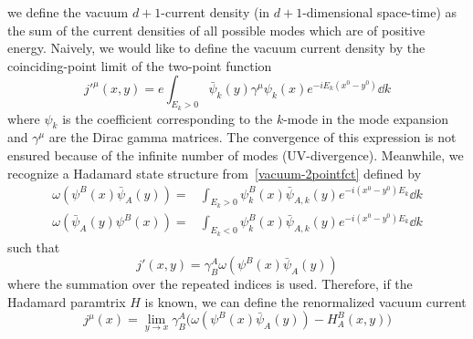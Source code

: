 we define the vacuum $d+1$-current density (in $d+1$-dimensional space-time) as the sum of the current densities of all possible modes which are of positive energy. 
Naively, we would like to define the vacuum current density by the coinciding-point limit of the two-point function
\begin{equation}\label{vacuum-2pointfct}
j'^{\mu}(x,y) =  e \int_{E_k > 0} \bar{\psi}_k(y)\gamma^\mu \psi_k(x) e^{- i E_k(x^0 - y^0)} \dd k
\end{equation}
where $\psi_k$ is the coefficient corresponding to the $k$-mode in the mode expansion and $\gamma^\mu$ are the Dirac gamma matrices.
The convergence of this expression is not ensured because of the infinite number of modes (UV-divergence).
Meanwhile, we recognize a Hadamard state structure from~\cref{vacuum-2pointfct} defined by 
\begin{equation}\label{vacuum-hadamardstate}
\begin{split}
\omega(\psi^B(x)\bar{\psi}_A(y)) = & \int_{E_k >0} \psi_k^B(x)\bar{\psi}_{A,k}(y)e^{-i(x^0-y^0)E_k} \dd k \\
\omega(\bar{\psi}_A(y)\psi^B(x)) = & \int_{E_k <0} \psi_k^B(x)\bar{\psi}_{A,k}(y)e^{-i(x^0-y^0)E_k} \dd k 
\end{split}
\end{equation}
such that 
\begin{equation*}
j'(x,y) = \gamma^A_B \omega(\psi^B(x)\bar{\psi}_A(y)) 
\end{equation*}
where the summation over the repeated indices is used.
Therefore, if the Hadamard paramtrix $H$ is known, we can define the renormalized vacuum current
\begin{equation}\label{vacuum-currentexpression}
j^\mu(x) = \lim_{y \rightarrow x} \gamma^A_B \big(
\omega(\psi^B(x)\bar{\psi}_A(y)) - H^B_A (x, y)\big)
\end{equation}
%
